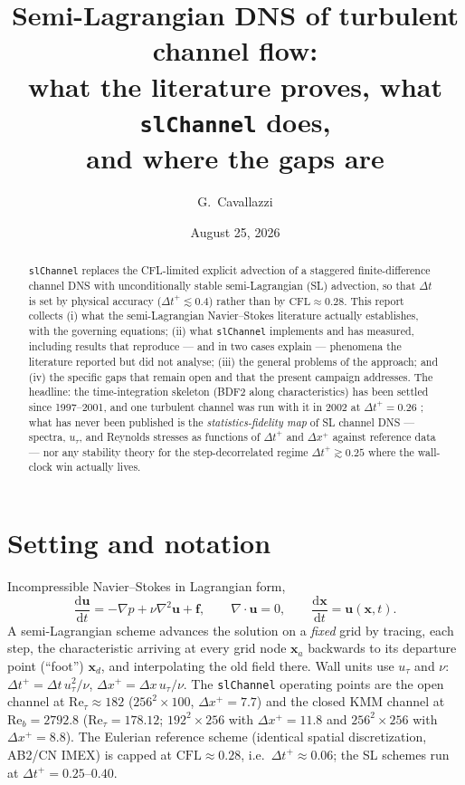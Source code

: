 \documentclass[11pt,a4paper]{article}
\title{Semi-Lagrangian DNS of turbulent channel flow:\\
what the literature proves, what \texttt{slChannel} does,\\
and where the gaps are}
\author{G.~Cavallazzi}
\date{August 25, 2026}
\newcommand{\ut}{u_\tau}
\newcommand{\Ret}{\mathrm{Re}_\tau}
\newcommand{\Reb}{\mathrm{Re}_b}
\newcommand{\dtp}{\Delta t^{+}}
\newcommand{\bu}{\mathbf{u}}
\newcommand{\bx}{\mathbf{x}}
\newcommand{\dd}{\mathrm{d}}
\begin{document}
\maketitle

\begin{abstract}
\noindent
\texttt{slChannel} replaces the CFL-limited explicit advection of a staggered
finite-difference channel DNS with unconditionally stable semi-Lagrangian (SL)
advection, so that $\Delta t$ is set by physical accuracy
($\dtp \lesssim 0.4$) rather than by $\mathrm{CFL}\approx0.28$. This report
collects (i) what the semi-Lagrangian Navier--Stokes literature
\cite{boukir97,xiu01,xu02,xiu05} actually establishes, with the governing
equations; (ii) what \texttt{slChannel} implements and has measured, including
results that reproduce --- and in two cases explain --- phenomena the
literature reported but did not analyse; (iii) the general problems of the
approach; and (iv) the specific gaps that remain open and that the present
campaign addresses. The headline: the time-integration skeleton
(BDF2 along characteristics) has been settled since 1997--2001, and one
turbulent channel was run with it in 2002 at $\dtp=0.26$
\cite{xu02}; what has never been published is the \emph{statistics-fidelity
map} of SL channel DNS --- spectra, $\ut$, and Reynolds stresses as functions
of $\dtp$ and $\Delta x^{+}$ against reference data --- nor any stability
theory for the step-decorrelated regime $\dtp\gtrsim0.25$ where the
wall-clock win actually lives.
\end{abstract}

\section{Setting and notation}

Incompressible Navier--Stokes in Lagrangian form,
\begin{equation}
\frac{\dd\bu}{\dd t} = -\nabla p + \nu\nabla^2\bu + \mathbf{f},
\qquad \nabla\cdot\bu = 0,
\qquad
\frac{\dd\bx}{\dd t} = \bu(\bx,t).
\label{eq:ns}
\end{equation}
A semi-Lagrangian scheme advances the solution on a \emph{fixed} grid by
tracing, each step, the characteristic arriving at every grid node $\bx_a$
backwards to its departure point (``foot'') $\bx_d$, and interpolating the old
field there. Wall units use $\ut$ and $\nu$:
$\dtp = \Delta t\,\ut^2/\nu$, $\Delta x^{+}=\Delta x\,\ut/\nu$. The
\texttt{slChannel} operating points are the open channel at
$\Ret\approx182$ ($256^2\times100$, $\Delta x^{+}=7.7$) and the closed
KMM \cite{kmm87} channel at $\Reb=2792.8$
($\Ret=178.12$; $192^2\times256$ with $\Delta x^{+}=11.8$ and
$256^2\times256$ with $\Delta x^{+}=8.8$). The Eulerian reference scheme
(identical spatial discretization, AB2/CN IMEX) is capped at
$\mathrm{CFL}\approx0.28$, i.e.\ $\dtp\approx0.06$; the SL schemes run at
$\dtp=0.25$--$0.40$.
\end{document}
